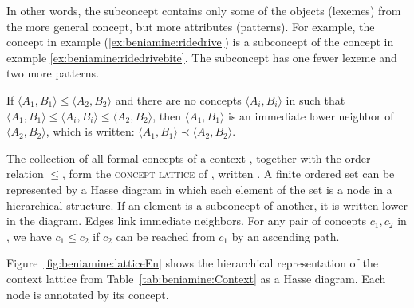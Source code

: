 \documentclass[output=paper]{langscibook}
\begin{document}
    In other words, the subconcept contains only some of the objects (lexemes) from the more general concept, but more attributes (patterns). For example, the concept in example (\ref{ex:beniamine:ridedrive}) is a subconcept of the concept in example \ref{ex:beniamine:ridedrivebite}. The subconcept has one fewer lexeme and two more patterns.
    
    If $\langle A_{1},B_{1} \rangle \leq \langle A_{2},B_{2} \rangle$ and there are no concepts $\langle A_{i},B_{i} \rangle$ in \context{} such that $\langle A_{1},B_{1} \rangle \leq \langle A_{i},B_{i} \rangle \leq \langle A_{2},B_{2} \rangle$, then $\langle A_{1},B_{1} \rangle$ is an immediate lower neighbor of $\langle A_{2},B_{2} \rangle$, which is written: $\langle A_{1},B_{1} \rangle \prec \langle A_{2},B_{2} \rangle$.
    
    The collection of all formal concepts of a context \context{}, together with the order relation $\leq$, form the \textsc{concept lattice} of \context{}, written \lattice{}. A finite ordered set can be represented by a Hasse diagram in which each element of the set is a node in a hierarchical structure. If an element is a subconcept of another, it is written lower in the diagram. Edges link immediate neighbors. For any pair of concepts  $c_{1}, c_{2}$ in \context{}, we have $c_{1} \leq c_{2}$ if $c_{2}$ can be reached from $c_{1}$ by an ascending path. 
    
    Figure~\ref{fig:beniamine:latticeEn} shows the hierarchical representation of the context lattice from Table~\ref{tab:beniamine:Context} as a Hasse diagram. Each node is annotated by its concept. 
    
\end{document}
